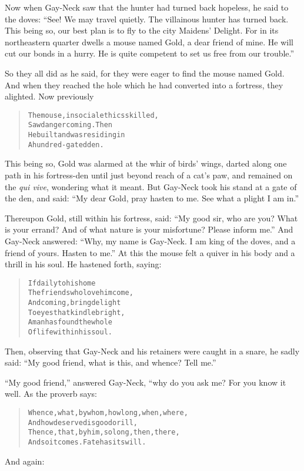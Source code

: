 \documentclass[article, twoside, 14pt]{memoir}
\renewenvironment{verbatim}{%
\begin{quote}%
\vskip -10pt%
\begin{alltt}\normalfont\large}{\end{alltt}%
\end{quote}%
\vskip -10pt
} %
\begin{document}
Now when Gay-Neck saw that the hunter had turned back hopeless, he
said to the doves:
``See! We may travel quietly. The villainous hunter has turned back. This being so, our best plan is to fly to the city Maidens' Delight. For in its northeastern quarter dwells a mouse named Gold, a dear friend of mine. He will cut our bonds in a hurry. He is quite competent to set us free from our trouble.''

So they all did as he said, for they were eager to find the mouse
named Gold. And when they reached the hole which he had converted
into a fortress, they alighted. Now previously

\begin{verbatim}
The mouse, in social ethics skilled,
    Saw danger coming. Then
He built and was residing in
    A hundred-gated den.
\end{verbatim}
This being so, Gold was alarmed at the whir of birds' wings, darted
along one path in his fortress-den until just beyond reach of a
cat's paw, and remained on the \emph{qui vive}, wondering what it
meant. But Gay-Neck took his stand at a gate of the den, and said:
``My dear Gold, pray hasten to me. See what a plight I am in.''

Thereupon Gold, still within his fortress, said:
``My good sir, who are you? What is your errand? And of what nature is your misfortune? Please inform me.''
And Gay-Neck answered:
``Why, my name is Gay-Neck. I am king of the doves, and a friend of yours. Hasten to me.''
At this the mouse felt a quiver in his body and a thrill in his
soul. He hastened forth, saying:

\begin{verbatim}
If daily to his home
The friends who love him come,
And coming, bring delight
To eyes that kindle bright,
A man has found the whole
Of life within his soul.
\end{verbatim}
Then, observing that Gay-Neck and his retainers were caught
in a snare, he sadly said:
``My good friend, what is this, and whence? Tell me.''

``My good friend,'' answered Gay-Neck, “why do you ask me? For you
know it well. As the proverb says:

\begin{verbatim}
Whence, what, by whom, how long, when, where,
    And how deserved is good or ill,
Thence, that, by him, so long, then, there,
    And so it comes. Fate has its will.
\end{verbatim}
And again:
\end{document}
